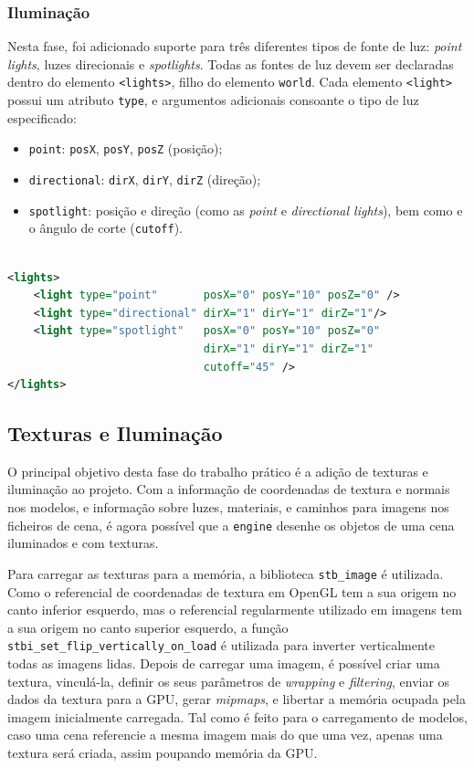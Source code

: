 \documentclass[12pt, a4paper]{article}
\begin{document}
\subsubsection{Iluminação}

Nesta fase, foi adicionado suporte para três diferentes tipos de fonte de luz: \emph{point lights},
luzes direcionais e \emph{spotlights}. Todas as fontes de luz devem ser declaradas dentro do
elemento \texttt{<lights>}, filho do elemento \texttt{world}. Cada elemento \texttt{<light>} possui
um atributo \texttt{type}, e argumentos adicionais consoante o tipo de luz especificado:

\begin{itemize}
    \item \texttt{point}: \texttt{posX}, \texttt{posY}, \texttt{posZ} (posição);
    \item \texttt{directional}: \texttt{dirX}, \texttt{dirY}, \texttt{dirZ} (direção);
    \item \texttt{spotlight}: posição e direção (como as \emph{point} e \emph{directional lights}),
        bem como e o ângulo de corte (\texttt{cutoff}).
\end{itemize}

\begin{lstlisting}[language=xml]

<lights>
    <light type="point"       posX="0" posY="10" posZ="0" />
    <light type="directional" dirX="1" dirY="1" dirZ="1"/>
    <light type="spotlight"   posX="0" posY="10" posZ="0"
                              dirX="1" dirY="1" dirZ="1"
                              cutoff="45" />
</lights>
\end{lstlisting}

\subsection{Texturas e Iluminação}

O principal objetivo desta fase do trabalho prático é a adição de texturas e iluminação ao projeto.
Com a informação de coordenadas de textura e normais nos modelos, e informação sobre luzes,
materiais, e caminhos para imagens nos ficheiros de cena, é agora possível que a \texttt{engine}
desenhe os objetos de uma cena iluminados e com texturas.

Para carregar as texturas para a memória, a biblioteca \texttt{stb\_image} \cite{stb-image} é
utilizada. Como o referencial de coordenadas de textura em OpenGL tem a sua origem no canto inferior
esquerdo, mas o referencial regularmente utilizado em imagens tem a sua origem no canto superior
esquerdo, a função \texttt{stbi\_set\_flip\_vertically\_on\_load} é utilizada para inverter
verticalmente todas as imagens lidas. Depois de carregar uma imagem, é possível criar uma textura,
vinculá-la, definir os seus parâmetros de \emph{wrapping} e \emph{filtering}, enviar os dados da
textura para a GPU, gerar \emph{mipmaps}, e libertar a memória ocupada pela imagem inicialmente
carregada. Tal como é feito para o carregamento de modelos, caso uma cena referencie a mesma imagem
mais do que uma vez, apenas uma textura será criada, assim poupando memória da GPU.
\end{document}
